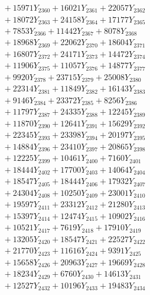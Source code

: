 \documentclass[a4paper,10pt]{article}
\begin{document}
{\begin{align}
&\;  + 15971 Y_{2360} + 16021 Y_{2361} + 22057 Y_{2362} \\[0.3ex]
&\;  + 18072 Y_{2363} + 24158 Y_{2364} + 17177 Y_{2365} \\[0.3ex]
&\;  + 7853 Y_{2366} + 11442 Y_{2367} + 8078 Y_{2368} \\[0.5ex]\allowbreak
&\;  + 18968 Y_{2369} + 22062 Y_{2370} + 18604 Y_{2371} \\[0.3ex]
&\;  + 16807 Y_{2372} + 24171 Y_{2373} + 14472 Y_{2374} \\[0.3ex]
&\;  + 11906 Y_{2375} + 11057 Y_{2376} + 14877 Y_{2377} \\[0.3ex]
&\;  + 9920 Y_{2378} + 23715 Y_{2379} + 25008 Y_{2380} \\[0.3ex]
&\;  + 22314 Y_{2381} + 11849 Y_{2382} + 16143 Y_{2383} \\[0.3ex]
&\;  + 9146 Y_{2384} + 23372 Y_{2385} + 8256 Y_{2386} \\[0.3ex]
&\;  + 11797 Y_{2387} + 24335 Y_{2388} + 12245 Y_{2389} \\[0.3ex]
&\;  + 11870 Y_{2390} + 12641 Y_{2391} + 15629 Y_{2392} \\[0.3ex]
&\;  + 22345 Y_{2393} + 23398 Y_{2394} + 20197 Y_{2395} \\[0.3ex]
&\;  + 14884 Y_{2396} + 23410 Y_{2397} + 20865 Y_{2398} \\[0.5ex]\allowbreak
&\;  + 12225 Y_{2399} + 10461 Y_{2400} + 7160 Y_{2401} \\[0.3ex]
&\;  + 18444 Y_{2402} + 17700 Y_{2403} + 14064 Y_{2404} \\[0.3ex]
&\;  + 18547 Y_{2405} + 18444 Y_{2406} + 17932 Y_{2407} \\[0.3ex]
&\;  + 24304 Y_{2408} + 10250 Y_{2409} + 23001 Y_{2410} \\[0.3ex]
&\;  + 19597 Y_{2411} + 23312 Y_{2412} + 21280 Y_{2413} \\[0.3ex]
&\;  + 15397 Y_{2414} + 12474 Y_{2415} + 10902 Y_{2416} \\[0.3ex]
&\;  + 10521 Y_{2417} + 7619 Y_{2418} + 17910 Y_{2419} \\[0.3ex]
&\;  + 13205 Y_{2420} + 18547 Y_{2421} + 22527 Y_{2422} \\[0.3ex]
&\;  + 21770 Y_{2423} + 11616 Y_{2424} + 9391 Y_{2425} \\[0.3ex]
&\;  + 15658 Y_{2426} + 20963 Y_{2427} + 19669 Y_{2428} \\[0.5ex]\allowbreak
&\;  + 18234 Y_{2429} + 6760 Y_{2430} + 14613 Y_{2431} \\[0.3ex]
&\;  + 12527 Y_{2432} + 10196 Y_{2433} + 19483 Y_{2434} \\[0.3ex]

\end{align}}
\end{document}
